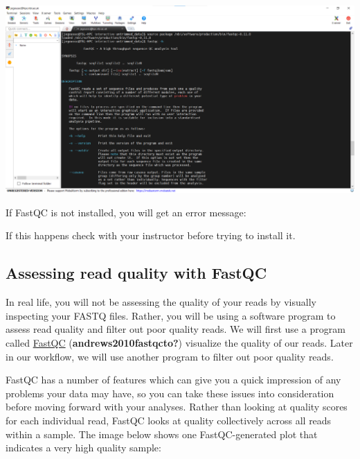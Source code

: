 \documentclass[
  letterpaper,
  DIV=11,
  numbers=noendperiod]{scrreprt}
\newenvironment{Shaded}{\begin{snugshade}}{\end{snugshade}}
\newcommand{\AttributeTok}[1]{\textcolor[rgb]{0.40,0.45,0.13}{#1}}
\newcommand{\ExtensionTok}[1]{\textcolor[rgb]{0.00,0.23,0.31}{#1}}
\newcommand{\FunctionTok}[1]{\textcolor[rgb]{0.28,0.35,0.67}{#1}}
\newcommand{\NormalTok}[1]{\textcolor[rgb]{0.00,0.23,0.31}{#1}}
\newcommand{\StringTok}[1]{\textcolor[rgb]{0.13,0.47,0.30}{#1}}
\begin{document}
\includegraphics{images/fastqc-help.png}

If FastQC is not installed, you will get an error message:

\begin{Shaded}
\end{Shaded}

If this happens check with your instructor before trying to install it.

\hypertarget{assessing-read-quality-with-fastqc}{%
\subsection{Assessing read quality with
FastQC}\label{assessing-read-quality-with-fastqc}}

In real life, you will not be assessing the quality of your reads by
visually inspecting your FASTQ files. Rather, you will be using a
software program to assess read quality and filter out poor quality
reads. We will first use a program called
\href{http://www.bioinformatics.babraham.ac.uk/projects/fastqc/}{FastQC}
(\textbf{andrews2010fastqcto?}) visualize the quality of our reads.
Later in our workflow, we will use another program to filter out poor
quality reads.

FastQC has a number of features which can give you a quick impression of
any problems your data may have, so you can take these issues into
consideration before moving forward with your analyses. Rather than
looking at quality scores for each individual read, FastQC looks at
quality collectively across all reads within a sample. The image below
shows one FastQC-generated plot that indicates a very high quality
sample:
\end{document}
